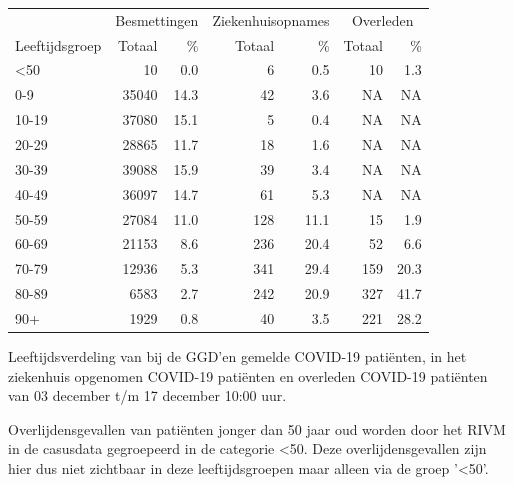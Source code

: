 \documentclass[
  english,
  man,floatsintext]{apa6}
\begin{document}
\begin{table}
\centering\begingroup\fontsize{11}{13}\selectfont

\begin{threeparttable}
\begin{tabular}{lrrrrrr}
\toprule
\multicolumn{1}{c}{ } & \multicolumn{2}{c}{Besmettingen} & \multicolumn{2}{c}{Ziekenhuisopnames} & \multicolumn{2}{c}{Overleden} \\
\cmidrule(l{3pt}r{3pt}){2-3} \cmidrule(l{3pt}r{3pt}){4-5} \cmidrule(l{3pt}r{3pt}){6-7}
Leeftijdsgroep & Totaal & \% & Totaal & \% & Totaal & \%\\
\midrule
<50 & 10 & 0.0 & 6 & 0.5 & 10 & 1.3\\
0-9 & 35040 & 14.3 & 42 & 3.6 & NA & NA\\
10-19 & 37080 & 15.1 & 5 & 0.4 & NA & NA\\
20-29 & 28865 & 11.7 & 18 & 1.6 & NA & NA\\
30-39 & 39088 & 15.9 & 39 & 3.4 & NA & NA\\
40-49 & 36097 & 14.7 & 61 & 5.3 & NA & NA\\
50-59 & 27084 & 11.0 & 128 & 11.1 & 15 & 1.9\\
60-69 & 21153 & 8.6 & 236 & 20.4 & 52 & 6.6\\
70-79 & 12936 & 5.3 & 341 & 29.4 & 159 & 20.3\\
80-89 & 6583 & 2.7 & 242 & 20.9 & 327 & 41.7\\
90+ & 1929 & 0.8 & 40 & 3.5 & 221 & 28.2\\
\bottomrule
\end{tabular}
\begin{tablenotes}
\item[1] Leeftijdsverdeling van bij de GGD’en gemelde COVID-19 patiënten, in het ziekenhuis opgenomen COVID-19 patiënten en overleden COVID-19 patiënten van 03 december t/m 17 december 10:00 uur.
\item[2] Overlijdensgevallen van patiënten jonger dan 50 jaar oud worden door het RIVM in de casusdata gegroepeerd in de categorie <50. Deze overlijdensgevallen zijn hier dus niet zichtbaar in deze leeftijdsgroepen maar alleen via de groep '<50'.
\end{tablenotes}
\end{threeparttable}
\endgroup{}
\end{table}

\newpage
\end{document}
